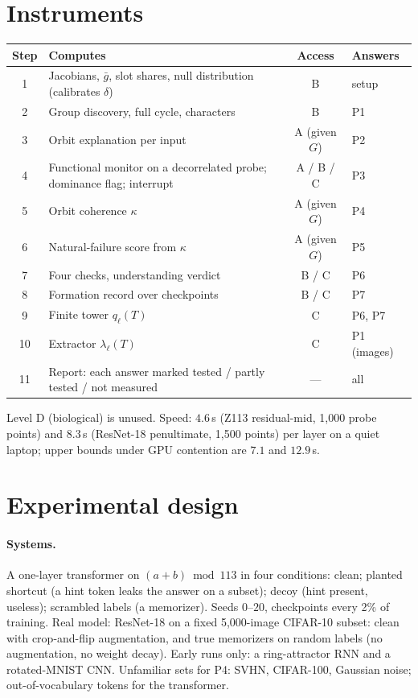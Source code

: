 \documentclass[11pt]{article}
\begin{document}
\section{Instruments}
\begin{table}[h]\centering\small
\begin{tabular}{@{}clcl@{}}
\toprule
Step & Computes & Access & Answers\\\midrule
1 & Jacobians, $\bar g$, slot shares, null distribution (calibrates $\delta$) & B & setup\\
2 & Group discovery, full cycle, characters & B & P1\\
3 & Orbit explanation per input & A (given $G$) & P2\\
4 & Functional monitor on a decorrelated probe; dominance flag; interrupt & A / B / C & P3\\
5 & Orbit coherence $\kappa$ & A (given $G$) & P4\\
6 & Natural-failure score from $\kappa$ & A (given $G$) & P5\\
7 & Four checks, understanding verdict & B / C & P6\\
8 & Formation record over checkpoints & B / C & P7\\
9 & Finite tower $q_\ell(T)$ & C & P6, P7\\
10 & Extractor $\lambda_\ell(T)$ & C & P1 (images)\\
11 & Report: each answer marked tested / partly tested / not measured & --- & all\\\bottomrule
\end{tabular}
\end{table}
Level D (biological) is unused. Speed: $4.6$\,s (Z113 residual-mid, 1{,}000 probe points) and $8.3$\,s (ResNet-18 penultimate, 1{,}500 points) per layer on a quiet laptop; upper bounds under GPU contention are $7.1$ and $12.9$\,s.

\section{Experimental design}
\paragraph{Systems.} A one-layer transformer on $(a+b)\bmod113$ in four conditions: clean; planted shortcut (a hint token leaks the answer on a subset); decoy (hint present, useless); scrambled labels (a memorizer). Seeds $0$--$20$, checkpoints every 2\% of training. Real model: ResNet-18 on a fixed 5{,}000-image CIFAR-10 subset: clean with crop-and-flip augmentation, and true memorizers on random labels (no augmentation, no weight decay). Early runs only: a ring-attractor RNN and a rotated-MNIST CNN. Unfamiliar sets for P4: SVHN, CIFAR-100, Gaussian noise; out-of-vocabulary tokens for the transformer.
\end{document}
